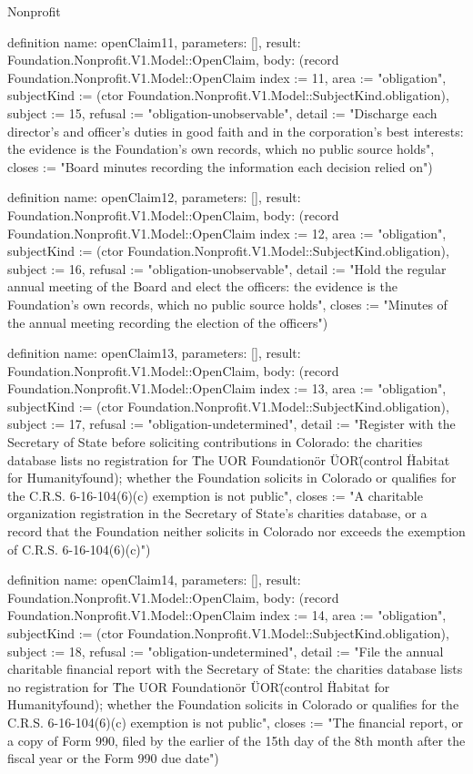 \begin{lexlean}{Nonprofit}
\begin{semanticmodule}
definition{
  name: openClaim11,
  parameters: [],
  result: Foundation.Nonprofit.V1.Model::OpenClaim,
  body: (record Foundation.Nonprofit.V1.Model::OpenClaim {index := 11, area := "obligation", subjectKind := (ctor Foundation.Nonprofit.V1.Model::SubjectKind.obligation), subject := 15, refusal := "obligation-unobservable", detail := "Discharge each director's and officer's duties in good faith and in the corporation's best interests: the evidence is the Foundation’s own records, which no public source holds", closes := "Board minutes recording the information each decision relied on"})
}

definition{
  name: openClaim12,
  parameters: [],
  result: Foundation.Nonprofit.V1.Model::OpenClaim,
  body: (record Foundation.Nonprofit.V1.Model::OpenClaim {index := 12, area := "obligation", subjectKind := (ctor Foundation.Nonprofit.V1.Model::SubjectKind.obligation), subject := 16, refusal := "obligation-unobservable", detail := "Hold the regular annual meeting of the Board and elect the officers: the evidence is the Foundation’s own records, which no public source holds", closes := "Minutes of the annual meeting recording the election of the officers"})
}

definition{
  name: openClaim13,
  parameters: [],
  result: Foundation.Nonprofit.V1.Model::OpenClaim,
  body: (record Foundation.Nonprofit.V1.Model::OpenClaim {index := 13, area := "obligation", subjectKind := (ctor Foundation.Nonprofit.V1.Model::SubjectKind.obligation), subject := 17, refusal := "obligation-undetermined", detail := "Register with the Secretary of State before soliciting contributions in Colorado: the charities database lists no registration for \"The UOR Foundation\" or \"UOR\" (control \"Habitat for Humanity\" found); whether the Foundation solicits in Colorado or qualifies for the C.R.S. 6-16-104(6)(c) exemption is not public", closes := "A charitable organization registration in the Secretary of State's charities database, or a record that the Foundation neither solicits in Colorado nor exceeds the exemption of C.R.S. 6-16-104(6)(c)"})
}

definition{
  name: openClaim14,
  parameters: [],
  result: Foundation.Nonprofit.V1.Model::OpenClaim,
  body: (record Foundation.Nonprofit.V1.Model::OpenClaim {index := 14, area := "obligation", subjectKind := (ctor Foundation.Nonprofit.V1.Model::SubjectKind.obligation), subject := 18, refusal := "obligation-undetermined", detail := "File the annual charitable financial report with the Secretary of State: the charities database lists no registration for \"The UOR Foundation\" or \"UOR\" (control \"Habitat for Humanity\" found); whether the Foundation solicits in Colorado or qualifies for the C.R.S. 6-16-104(6)(c) exemption is not public", closes := "The financial report, or a copy of Form 990, filed by the earlier of the 15th day of the 8th month after the fiscal year or the Form 990 due date"})
}


\end{semanticmodule}
\end{lexlean}

